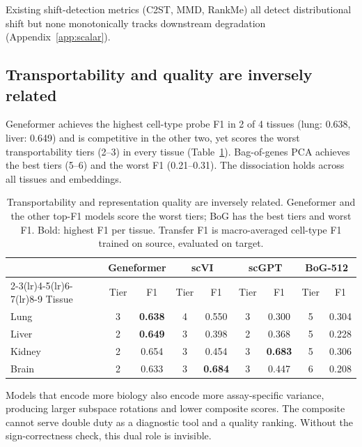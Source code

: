 \documentclass[11pt]{article}
\begin{document}
Existing shift-detection metrics (C2ST, MMD, RankMe) all detect distributional shift but none monotonically tracks downstream degradation (Appendix~\ref{app:scalar}).


\subsection{Transportability and quality are inversely related}
\label{sec:dissociation}

Geneformer achieves the highest cell-type probe F1 in 2 of 4 tissues (lung: 0.638, liver: 0.649) and is competitive in the other two, yet scores the worst transportability tiers (2--3) in every tissue (Table~\ref{tab:dissociation}). Bag-of-genes PCA achieves the best tiers (5--6) and the worst F1 (0.21--0.31). The dissociation holds across all tissues and embeddings.

\begin{table}[t]
\centering
\caption{Transportability and representation quality are inversely related. Geneformer and the other top-F1 models score the worst tiers; BoG has the best tiers and worst F1. Bold: highest F1 per tissue. Transfer F1 is macro-averaged cell-type F1 trained on source, evaluated on target.}
\label{tab:dissociation}
\small
\begin{tabular}{@{}lcccccccc@{}}
\toprule
 & \multicolumn{2}{c}{Geneformer} & \multicolumn{2}{c}{scVI} & \multicolumn{2}{c}{scGPT} & \multicolumn{2}{c}{BoG-512} \\
\cmidrule(lr){2-3}\cmidrule(lr){4-5}\cmidrule(lr){6-7}\cmidrule(lr){8-9}
Tissue & Tier & F1 & Tier & F1 & Tier & F1 & Tier & F1 \\
\midrule
Lung   & 3 & \textbf{0.638} & 4 & 0.550 & 3 & 0.300 & 5 & 0.304 \\
Liver  & 2 & \textbf{0.649} & 3 & 0.398 & 2 & 0.368 & 5 & 0.228 \\
Kidney & 2 & 0.654 & 3 & 0.454 & 3 & \textbf{0.683} & 5 & 0.306 \\
Brain  & 2 & 0.633 & 3 & \textbf{0.684} & 3 & 0.447 & 6 & 0.208 \\
\bottomrule
\end{tabular}
\end{table}

Models that encode more biology also encode more assay-specific variance, producing larger subspace rotations and lower composite scores. The composite cannot serve double duty as a diagnostic tool and a quality ranking. Without the sign-correctness check, this dual role is invisible.
\end{document}
